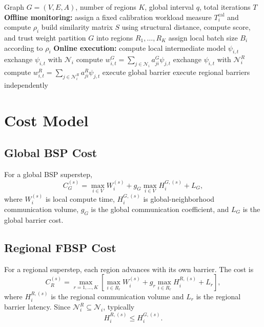 ﻿\documentclass[10pt,journal]{IEEEtran}
\begin{document}
	\begin{algorithm}[t]
		\caption{Hardware-Centric FBSP Execution}
		\label{alg:fbsp}
		\begin{algorithmic}[1]
			\Require Graph $G=(V,E,A)$, number of regions $K$, global interval $q$, total iterations $T$
			\State \textbf{Offline monitoring:}
			\State assign a fixed calibration workload
			\State measure $T_i^{\mathrm{cal}}$ and compute $\rho_i$
			\EndFor
			\State build similarity matrix $S$ using structural distance, compute score, and trust weight
			\State partition $G$ into regions ${R_1,\ldots,R_K}$
			\State assign local batch size $B_i$ according to $\rho_i$
			\State \textbf{Online execution:}
			\State compute local intermediate model $\psi_{i,t}$
			\State exchange $\psi_{i,t}$ with $\mathcal{N}_i$
			\State compute $w_{i,t}^{G}=\sum_{j\in\mathcal{N}_i}a_{ji}^{G}\psi_{j,t}$
			\Else
			\State exchange $\psi_{i,t}$ with $\mathcal{N}_i^R$
			\State compute $w_{i,t}^{R}=\sum_{j\in\mathcal{N}_i^R}a_{ji}^{R}\psi_{j,t}$
			\EndIf
			\EndFor
			\State execute global barrier
			\Else
			\State execute regional barriers independently
			\EndIf
			\EndFor
		\end{algorithmic}
	\end{algorithm}
	
	\section{Cost Model}
	
	\subsection{Global BSP Cost}
	
	For a global BSP superstep,
	\[
	C_G^{(s)}
	=
	\max_{i\in V} W_i^{(s)}
	+
	g_G\max_{i\in V} H_i^{G,(s)}
	+
	L_G,
	\]
	where $W_i^{(s)}$ is local compute time, $H_i^{G,(s)}$ is global-neighborhood communication volume, $g_G$ is the global communication coefficient, and $L_G$ is the global barrier cost.
	
	\subsection{Regional FBSP Cost}
	
	For a regional superstep, each region advances with its own barrier. The cost is
	\[
	C_R^{(s)}
	=
	\max_{r=1,\ldots,K}
	\left[
	\max_{i\in R_r} W_i^{(s)}
	+
	g_r\max_{i\in R_r} H_i^{R,(s)}
	+
	L_r
	\right],
	\]
	where $H_i^{R,(s)}$ is the regional communication volume and $L_r$ is the regional barrier latency. Since $\mathcal{N}_i^R\subseteq \mathcal{N}_i$, typically
	\[
	H_i^{R,(s)} \leq H_i^{G,(s)}.
	\]
	
\end{document}
